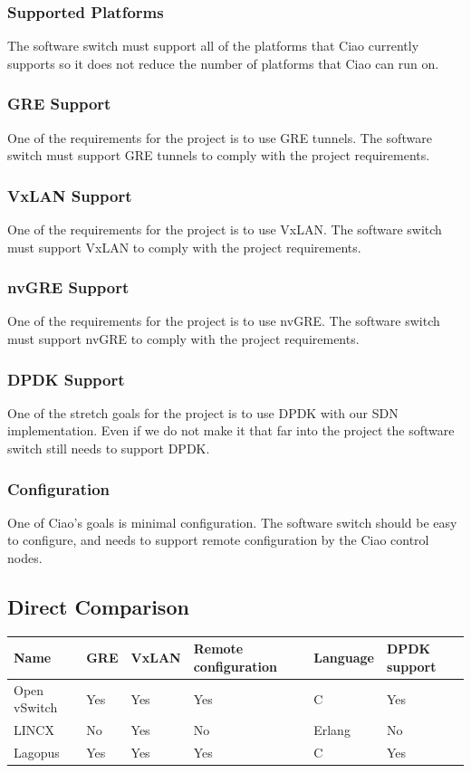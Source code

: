 \documentclass[10pt,letterpaper,onecolumn,journal]{IEEEtran}
\begin{document}
\subsubsection{Supported Platforms}
The software switch must support all of the platforms that Ciao currently supports so it does
not reduce the number of platforms that Ciao can run on.
\subsubsection{GRE Support}
One of the requirements for the project is to use GRE tunnels.
The software switch must support GRE tunnels to comply with the project requirements.
\subsubsection{VxLAN Support}
One of the requirements for the project is to use VxLAN.
The software switch must support VxLAN to comply with the project requirements.
\subsubsection{nvGRE Support}
One of the requirements for the project is to use nvGRE.
The software switch must support nvGRE to comply with the project requirements.
\subsubsection{DPDK Support}
One of the stretch goals for the project is to use DPDK with our SDN implementation.
Even if we do not make it that far into the project the software switch still needs
to support DPDK.
\subsubsection{Configuration}
One of Ciao's goals is minimal configuration.
The software switch should be easy to configure, and needs to support remote configuration by the Ciao control nodes. 

\subsection{Direct Comparison}

\begin{center}
	\begin{tabular}{| l | l | l | l | l | l |}
		\hline
		Name & GRE & VxLAN & Remote configuration & Language & DPDK support  \\ \hline
		Open vSwitch & Yes & Yes & Yes & C & Yes \\ \hline
		LINCX & No & Yes & No & Erlang & No \\ \hline
		Lagopus & Yes & Yes & Yes & C & Yes \\ \hline
	\end{tabular}
\end{center}
\end{document}
